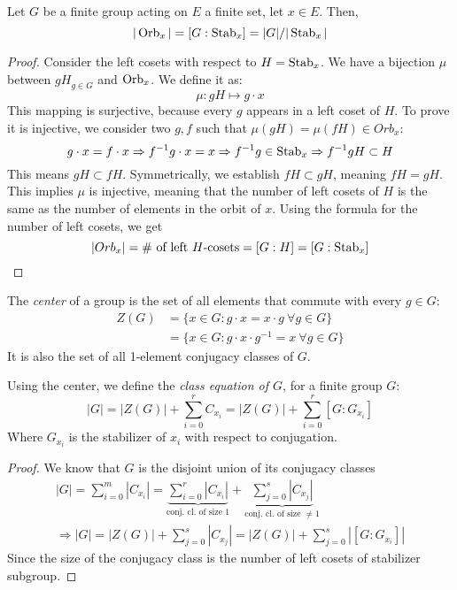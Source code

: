 \begin{theorem}
  Let $G$ be a finite group acting on $E$ a finite set, let $x \in E$. Then, 
  \[
    |\operatorname{Orb}_x| = [G : \operatorname{Stab}_x] = |G|/|\operatorname{Stab}_x|
  \]
\end{theorem}
\begin{proof}
  Consider the left cosets with respect to $H = \operatorname{Stab}_x$. We have a bijection $\mu$ between ${gH}_{g \in G}$ and $\operatorname{Orb}_x$. We define it as: 
  \[
    \mu: gH \mapsto g \cdot x
  \]
  This mapping is surjective, because every $g$ appears in a left coset of $H$. To prove it is injective, we consider two $g, f$ such that $\mu(gH) = \mu(fH) \in Orb_x$: 
  \[
    g \cdot x = f \cdot x \Rightarrow f^{-1} g \cdot x = x \Rightarrow f^{-1}g \in \operatorname{Stab}_x \Rightarrow f^{-1}gH \subset H 
  \]
  This means $gH \subset fH$. Symmetrically, we establish $fH \subset gH$, meaning $fH = gH$. This implies $\mu$ is injective, meaning that the number of left cosets of $H$ is the same as the number of elements in the orbit of $x$. Using the formula for the number of left cosets, we get
  \[
    |Orb_x| = \# \text{ of left $H$-cosets} = [G : H] = [G : \operatorname{Stab}_x]
  \]
\end{proof}

\begin{definition}
  The \emph{center} of a group is the set of all elements that commute with every $g \in G$: 
  \begin{align*}
    Z(G) 
    &= \{x \in G: g \cdot x = x \cdot g \ \forall g \in G\} \\
    &= \{x \in G: g \cdot x \cdot g^{-1} = x\ \forall g \in G\}
  \end{align*}
  It is also the set of all 1-element conjugacy classes of $G$. 
\end{definition}
\begin{theorem}
  Using the center, we define the \emph{class equation of $G$}, for a finite group $G$: 
  \[
    |G| = |Z(G)| + \sum_{i = 0}^rC_{x_i} = |Z(G)| + \sum_{i = 0}^{r} [G:G_{x_i}]
  \]
  Where $G_{x_i}$ is the stabilizer of $x_i$ with respect to conjugation. 
\end{theorem}
\begin{proof}
  We know that $G$ is the disjoint union of its conjugacy classes
  \begin{gather*}
    |G| = \sum_{i = 0}^m |C_{x_i}| = \underbrace{\sum_{i = 0}^r |C_{x_i}|}_{\text{conj. cl. of size } 1} + \underbrace{\sum_{j = 0}^s |C_{x_j}|}_{\text{conj. cl. of size } \neq 1} \\
    \Rightarrow |G| = |Z(G)| + \sum_{j = 0}^s |C_{x_j}| = |Z(G)| + \sum_{j = 0}^s |[G:G_{x_i}]|
  \end{gather*}
  Since the size of the conjugacy class is the number of left cosets of stabilizer subgroup. 
\end{proof}

